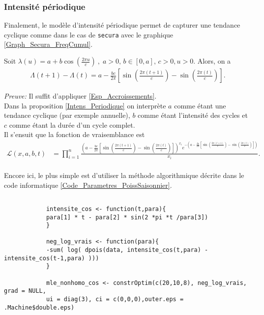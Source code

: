 		\subsubsection{Intensité périodique}
			Finalement, le modèle d'intensité périodique permet de capturer une tendance cyclique comme dans le cas de \texttt{secura} avec le graphique \ref{Graph_Secura_FreqCumul}.
			\begin{Proposition}\label{Intens_Periodique}
			Soit $\lambda(u) = a+b \cos\left(\frac{2\pi u}{c}\right) \ , \; a>0,\,b \in \left[0,a\right],\,c>0, u>0. $ Alors, on a\\
			\begin{align*} 
				\Lambda(t+1) - \Lambda(t) = a-\frac{bc}{2\pi}\left[\sin\left(\frac{2\pi(t+1)}{c}\right)-\sin\left(\frac{2\pi(t)}{c}\right)\right] .
			\end{align*}
			\end{Proposition}
			\textit{Preuve:} Il suffit d'appliquer \ref{Esp_Accroissements}.\\
			
			Dans la proposition \ref{Intens_Periodique} on interprète $a$ comme étant une tendance cyclique (par exemple annuelle), $b$ comme étant l'intensité des cycles et $c$ comme étant la durée d'un cycle complet. \\
			
			Il s'ensuit que la fonction de vraisemblance est
			\begin{align*}
			\mathcal{L}\left( x,a,b,t \right) 
				&= \prod_{i=1}^{n} \frac{ \left(  a-\frac{bc}{2\pi}\left[\sin\left(\frac{2\pi(t+1)}{c}\right)-\sin\left(\frac{2\pi(t)}{c}\right)\right]  \right)^{x_i} 		e^{-\left(a-\frac{bc}{2\pi}\left[\sin\left(\frac{2\pi(t+1)}{c}\right)-\sin\left(\frac{2\pi(t)}{c}\right)\right] \right)} }{x_i}.\\
			\end{align*}
			
			Encore ici, le plus simple est d'utiliser la méthode algorithmique décrite dans le code informatique \ref{Code_Parametres_PoissSaisonnier}.
			
			\begin{Code} \label{Code_Parametres_PoissSaisonnier}
			\begin{verbatim}	
			
			intensite_cos <- function(t,para){
			para[1] * t - para[2] * sin(2 *pi *t /para[3])
			}
			
			neg_log_vrais <- function(para){
			-sum( log( dpois(data, intensite_cos(t,para) - intensite_cos(t-1,para) )))
			}
			
			mle_nonhomo_cos <- constrOptim(c(20,10,8), neg_log_vrais, grad = NULL, 
			ui = diag(3), ci = c(0,0,0),outer.eps = .Machine$double.eps)
			\end{verbatim}
			\end{Code}